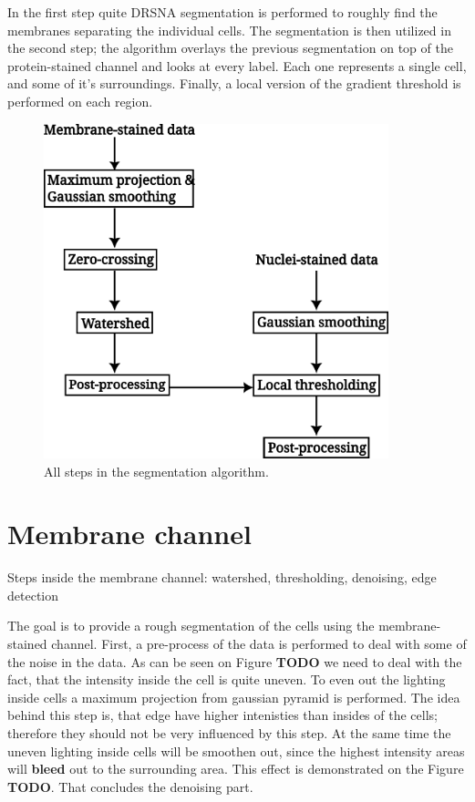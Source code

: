 \documentclass[
  digital,     %
  oneside,     %
  nosansbold,  %
  nocolorbold, %
  lof,         %
  lot,         %
]{fithesis4}
\begin{document}
In the first step quite DRSNA segmentation is performed to roughly find the
membranes separating the individual cells. The segmentation is then utilized in
the second step; the algorithm overlays the previous segmentation on top of the
protein-stained channel and looks at every label. Each one represents a single
cell, and some of it's surroundings. Finally, a local version of the gradient 
threshold is performed on each region.

\begin{figure}
    \begin{center}
        \includegraphics[width=10cm]{./resources/inkscape/segmentation-steps.png}
    \end{center}
    \caption{All steps in the segmentation algorithm.}
    \label{fig:segmentation_steps}
\end{figure}

\section{Membrane channel}
Steps inside the membrane channel: watershed, thresholding, denoising, edge
detection

The goal is to provide a rough segmentation of the cells using the
membrane-stained channel. First, a pre-process of the data is performed to deal
with some of the noise in the data. As can be seen on Figure \textbf{TODO} we
need to deal with the fact, that the intensity inside the cell is quite uneven.
To even out the lighting inside cells a maximum projection from gaussian pyramid
is performed. The idea behind this step is, that edge have higher intenisties
than insides of the cells; therefore they should not be very influenced by this
step. At the same time the uneven lighting inside cells will be smoothen out,
since the highest intensity areas will \textbf{bleed} out to the surrounding
area. This effect is demonstrated on the Figure \textbf{TODO}. That concludes
the denoising part.
\end{document}
